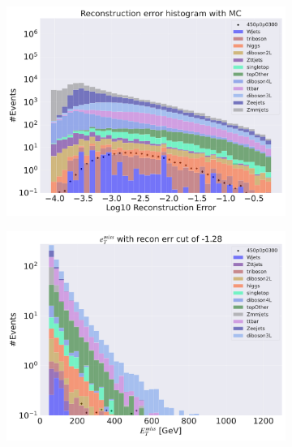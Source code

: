 \begin{figure}[H]
    \centering
    \begin{subfigure}{.40\textwidth}
        \includegraphics[width=\textwidth]{Figures/AE_testing/small/3lep/b_data_recon_big_rm3_feats_sig_450p0p0300.pdf}
        \caption{ }
        \label{fig:AE_3lep_small_450_2}
    \end{subfigure}
    \hfill
    \begin{subfigure}{.40\textwidth}
        \includegraphics[width=\textwidth]{Figures/AE_testing/small/3lep/b_data_recon_big_rm3_feats_sig_450p0p0300_etmiss_recon_errcut_-1.28.pdf}
        \caption{}
        \label{fig:AE_3lep_small_etmiss_450_2}
    \end{subfigure}

\end{figure}
